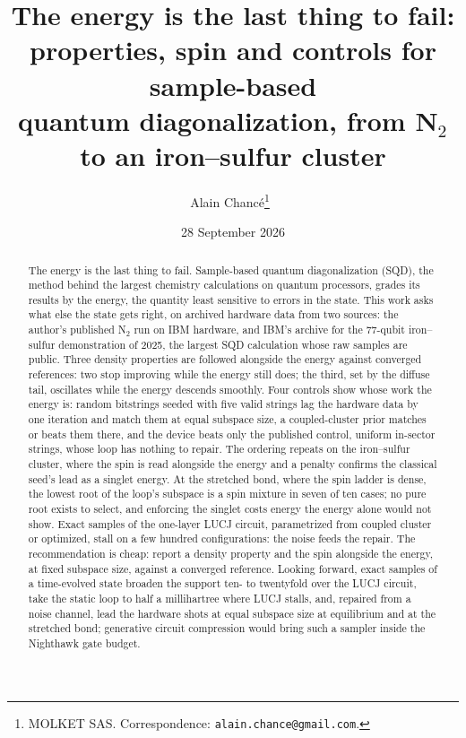 \documentclass[11pt]{article}
\title{The energy is the last thing to fail:\\ properties, spin and controls for sample-based\\ quantum diagonalization, from N$_2$ to an iron--sulfur cluster}
\author{Alain Chanc\'e\thanks{MOLKET SAS. Correspondence:
\texttt{alain.chance@gmail.com}.}~\orcidlink{0009-0004-3619-2267}}
\date{28 September 2026}
\begin{document}
\maketitle

\begin{abstract}
The energy is the last thing to fail. Sample-based quantum diagonalization (SQD), the method behind the largest chemistry calculations on quantum processors, grades its results by the energy, the quantity least sensitive to errors in the state. This work asks what else the state gets right, on archived hardware data from two sources: the author's published N$_2$ run on IBM hardware, and IBM's archive for the 77-qubit iron--sulfur demonstration of 2025, the largest SQD calculation whose raw samples are public. Three density properties are followed alongside the energy against converged references: two stop improving while the energy still does; the third, set by the diffuse tail, oscillates while the energy descends smoothly. Four controls show whose work the energy is: random bitstrings seeded with five valid strings lag the hardware data by one iteration and match them at equal subspace size, a coupled-cluster prior matches or beats them there, and the device beats only the published control, uniform in-sector strings, whose loop has nothing to repair. The ordering repeats on the iron--sulfur cluster, where the spin is read alongside the energy and a penalty confirms the classical seed's lead as a singlet energy. At the stretched bond, where the spin ladder is dense, the lowest root of the loop's subspace is a spin mixture in seven of ten cases; no pure root exists to select, and enforcing the singlet costs energy the energy alone would not show. Exact samples of the one-layer LUCJ circuit, parametrized from coupled cluster or optimized, stall on a few hundred configurations: the noise feeds the repair. The recommendation is cheap: report a density property and the spin alongside the energy, at fixed subspace size, against a converged reference. Looking forward, exact samples of a time-evolved state broaden the support ten- to twentyfold over the LUCJ circuit, take the static loop to half a millihartree where LUCJ stalls, and, repaired from a noise channel, lead the hardware shots at equal subspace size at equilibrium and at the stretched bond; generative circuit compression would bring such a sampler inside the Nighthawk gate budget.
\end{abstract}

\tableofcontents


\end{document}
